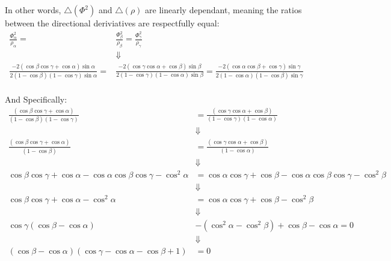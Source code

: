 \documentclass[a4paper,10pt]{article}
\begin{document}
In other words, $\bigtriangleup\left(\Phi^2\right)$ and $\bigtriangleup\left(\rho\right)$ are 
linearly dependant, meaning the ratios between the directional deriviatives are respectfully equal:
\begin{align*}
  \frac{\Phi^2_\alpha}{\rho_\alpha} = &\frac{\Phi^2_\beta}{\rho_\beta} = \frac{\Phi^2_\gamma}{\rho_\gamma}\\
  &\Downarrow\\
  \frac{-2\left(\cos{\beta}\cos{\gamma} + \cos{\alpha}\right)\sin{\alpha}}{2\left(1 - \cos{\beta}\right)\left(1 - \cos{\gamma}\right)\sin{\alpha}} = 
  &\frac{-2\left(\cos{\gamma}\cos{\alpha} + \cos{\beta}\right)\sin{\beta}}{2\left(1 - \cos{\gamma}\right)\left(1 - \cos{\alpha}\right)\sin{\beta}} = 
  \frac{-2\left(\cos{\alpha}\cos{\beta} + \cos{\gamma}\right)\sin{\gamma}}{2\left(1 - \cos{\alpha}\right)\left(1 - \cos{\beta}\right)\sin{\gamma}}\\
\end{align*}

And Specifically:
\begin{align*}
\frac{\left(\cos{\beta}\cos{\gamma} + \cos{\alpha}\right)}{\left(1 - \cos{\beta}\right)\left(1 - \cos{\gamma}\right)} &=
\frac{\left(\cos{\gamma}\cos{\alpha} + \cos{\beta}\right)}{\left(1 - \cos{\gamma}\right)\left(1 - \cos{\alpha}\right)}\\
  &\Downarrow\\
\frac{\left(\cos{\beta}\cos{\gamma} + \cos{\alpha}\right)}{\left(1 - \cos{\beta}\right)} &=
\frac{\left(\cos{\gamma}\cos{\alpha} + \cos{\beta}\right)}{\left(1 - \cos{\alpha}\right)}\\
  &\Downarrow\\
\cos{\beta}\cos{\gamma} + \cos{\alpha} - \cos{\alpha}\cos{\beta}\cos{\gamma} - \cos^2{\alpha} &=
\cos{\alpha}\cos{\gamma} + \cos{\beta} - \cos{\alpha}\cos{\beta}\cos{\gamma} - \cos^2{\beta}\\
  &\Downarrow\\
\cos{\beta}\cos{\gamma} + \cos{\alpha} - \cos^2{\alpha} &=
\cos{\alpha}\cos{\gamma} + \cos{\beta} - \cos^2{\beta}\\
  &\Downarrow\\
\cos{\gamma}\left(\cos{\beta}-\cos{\alpha}\right) &- \left(\cos^2{\alpha}-\cos^2{\beta}\right) + \cos{\beta} - \cos{\alpha} = 0\\
  &\Downarrow\\
\left(\cos{\beta} - \cos{\alpha}\right)\left(\cos{\gamma} - \cos{\alpha} - \cos{\beta} + 1\right) &=0
\end{align*}
\end{document}
